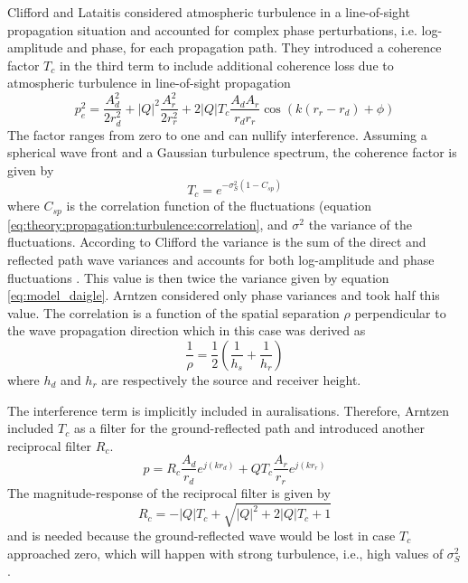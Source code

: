 Clifford and Lataitis considered atmospheric turbulence in a line-of-sight
propagation situation and accounted for complex phase perturbations, i.e.
log-amplitude and phase, for each propagation path. They introduced a coherence
factor $T_c$ in the third term to include additional coherence loss due to
atmospheric turbulence in line-of-sight propagation
\begin{equation}
  p_{e}^2 = \frac{A_d^2}{2 r_d^2} + |Q|^2 \frac{A_r^2}{2 r_r^2} + 2 |Q| T_c \frac{A_d A_r}{r_d r_r} \cos{\left(k \left( r_r - r_d \right) + \phi  \right)}
\end{equation}
The factor ranges from zero to one and can nullify interference.
Assuming a spherical wave front and a Gaussian turbulence spectrum, the coherence factor is given by
\begin{equation}
  T_c = e^{-\sigma_S^2 \left(1 - C_{sp}\right)}
\end{equation}
where $C_{sp}$ is the correlation function of the fluctuations (equation
\eqref{eq:theory:propagation:turbulence:correlation}, and $\sigma^2$ the variance of the fluctuations.
According to Clifford the variance is the sum of the direct and reflected path wave variances and accounts for both log-amplitude and phase fluctuations \cite{Clifford1983}.
This value is then twice the variance given by equation \ref{eq:model_daigle}.
Arntzen considered only phase variances and took half this value.
The correlation is a function of the spatial separation $\rho$
perpendicular to the wave propagation direction which in this case was derived as
\begin{equation}
  \frac{1}{\rho} = \frac{1}{2} \left( \frac{1}{h_s} + \frac{1}{h_r}  \right)
\end{equation}
where $h_d$ and $h_r$ are respectively the source and receiver height.

The interference term is implicitly included in auralisations. Therefore,
Arntzen included $T_c$ as a filter for the ground-reflected path and introduced
another reciprocal filter $R_c$.
\begin{equation}
  p = R_c \frac{A_d}{r_d} e^{j\left(k r_d \right) } + Q T_c \frac{A_r}{r_r} e^{j\left(k r_r \right) }
\end{equation}
The magnitude-response of the reciprocal filter is given by
\begin{equation}
  R_c = - |Q| T_c + \sqrt{|Q|^2 + 2 |Q| T_c + 1}
\end{equation}
and is needed because the ground-reflected wave would be lost in case $T_c$ approached
zero, which will happen with strong turbulence, i.e., high values of
$\sigma^2_S$.

